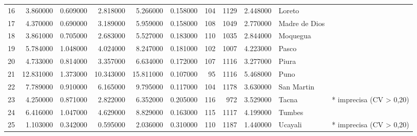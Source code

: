 \begin{table}[htbp]
\begin{tabular}{lrrrrrrrrll}
16 & 3.860000 & 0.609000 & 2.818000 & 5.266000 & 0.158000 & 104 & 1129 & 2.448000 & Loreto &  \\
17 & 4.370000 & 0.690000 & 3.189000 & 5.959000 & 0.158000 & 108 & 1049 & 2.770000 & Madre de Dios &  \\
18 & 3.861000 & 0.705000 & 2.683000 & 5.527000 & 0.183000 & 110 & 1035 & 2.844000 & Moquegua &  \\
19 & 5.784000 & 1.048000 & 4.024000 & 8.247000 & 0.181000 & 102 & 1007 & 4.223000 & Pasco &  \\
20 & 4.733000 & 0.814000 & 3.357000 & 6.634000 & 0.172000 & 107 & 1116 & 3.277000 & Piura &  \\
21 & 12.831000 & 1.373000 & 10.343000 & 15.811000 & 0.107000 & 95 & 1116 & 5.468000 & Puno &  \\
22 & 7.789000 & 0.910000 & 6.165000 & 9.795000 & 0.117000 & 104 & 1178 & 3.630000 & San Martin &  \\
23 & 4.250000 & 0.871000 & 2.822000 & 6.352000 & 0.205000 & 116 & 972 & 3.529000 & Tacna & * imprecisa (CV > 0,20) \\
24 & 6.416000 & 1.047000 & 4.629000 & 8.829000 & 0.163000 & 115 & 1117 & 4.199000 & Tumbes &  \\
25 & 1.103000 & 0.342000 & 0.595000 & 2.036000 & 0.310000 & 110 & 1187 & 1.440000 & Ucayali & * imprecisa (CV > 0,20) \\
\bottomrule
\end{tabular}
\end{table}
